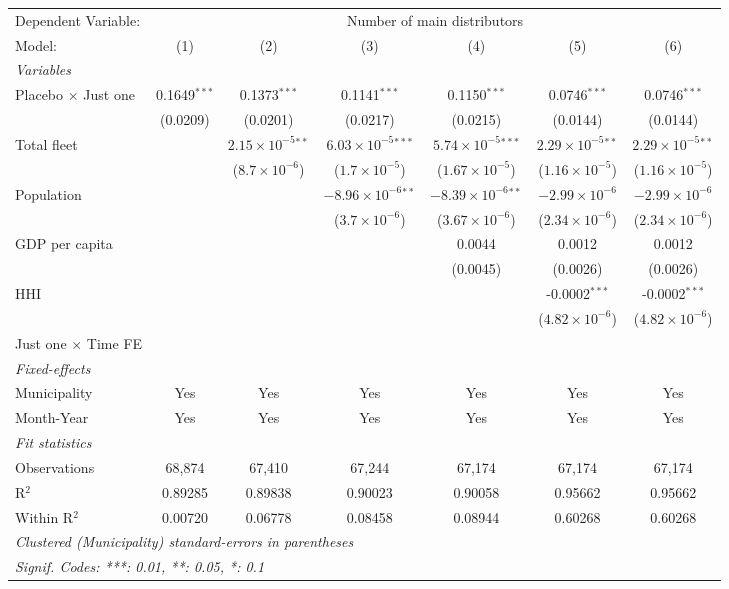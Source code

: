 \documentclass[
]{article}
\begin{document}
\begin{tabular}{lcccccc}
\tabularnewline\midrule\midrule
Dependent Variable:&\multicolumn{6}{c}{Number of main distributors}\\
Model:&(1) & (2) & (3) & (4) & (5) & (6)\\
\midrule \emph{Variables}&   &   &   &   &   &  \\
Placebo $\times $ Just one & 0.1649$^{***}$ & 0.1373$^{***}$ & 0.1141$^{***}$ & 0.1150$^{***}$ & 0.0746$^{***}$ & 0.0746$^{***}$\\
  &(0.0209) & (0.0201) & (0.0217) & (0.0215) & (0.0144) & (0.0144)\\
Total fleet &    & $2.15\times 10^{-5}$$^{**}$ & $6.03\times 10^{-5}$$^{***}$ & $5.74\times 10^{-5}$$^{***}$ & $2.29\times 10^{-5}$$^{**}$ & $2.29\times 10^{-5}$$^{**}$\\
  &   & ($8.7\times 10^{-6}$) & ($1.7\times 10^{-5}$) & ($1.67\times 10^{-5}$) & ($1.16\times 10^{-5}$) & ($1.16\times 10^{-5}$)\\
Population &    &    & $-8.96\times 10^{-6}$$^{**}$ & $-8.39\times 10^{-6}$$^{**}$ & $-2.99\times 10^{-6}$ & $-2.99\times 10^{-6}$\\
  &   &    & ($3.7\times 10^{-6}$) & ($3.67\times 10^{-6}$) & ($2.34\times 10^{-6}$) & ($2.34\times 10^{-6}$)\\
GDP per capita &    &    &    & 0.0044 & 0.0012 & 0.0012\\
  &   &    &    & (0.0045) & (0.0026) & (0.0026)\\
HHI &    &    &    &    & -0.0002$^{***}$ & -0.0002$^{***}$\\
  &   &    &    &    & ($4.82\times 10^{-6}$) & ($4.82\times 10^{-6}$)\\
Just one $\times$ Time FE &  &  &  &  &  & \\
\midrule \emph{Fixed-effects}&   &   &   &   &   &  \\
Municipality & Yes & Yes & Yes & Yes & Yes & Yes\\
Month-Year & Yes & Yes & Yes & Yes & Yes & Yes\\
\midrule \emph{Fit statistics}&  & & & & & \\
Observations & 68,874&67,410&67,244&67,174&67,174&67,174\\
R$^2$ & 0.89285&0.89838&0.90023&0.90058&0.95662&0.95662\\
Within R$^2$ & 0.00720&0.06778&0.08458&0.08944&0.60268&0.60268\\
\midrule\midrule\multicolumn{7}{l}{\emph{Clustered (Municipality) standard-errors in parentheses}}\\
\multicolumn{7}{l}{\emph{Signif. Codes: ***: 0.01, **: 0.05, *: 0.1}}\\
\end{tabular}
\end{document}
